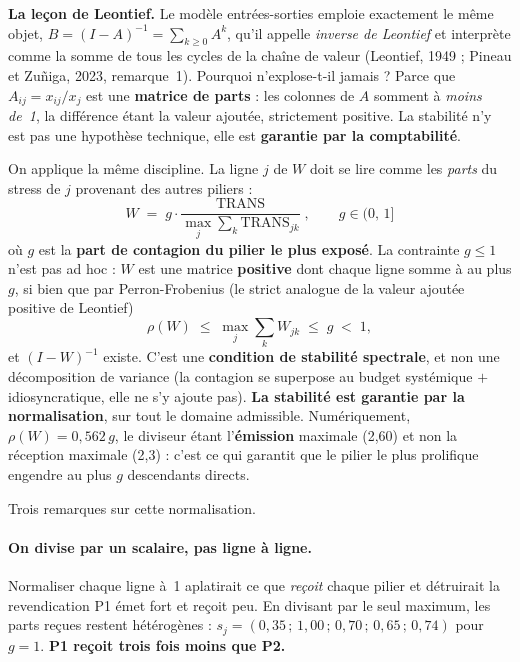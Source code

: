 \documentclass[11pt,a4paper]{article}
\begin{document}
\begin{cle}
\textbf{La leçon de Leontief.} Le modèle entrées-sorties emploie exactement le même objet,
$B = (I-A)^{-1} = \sum_{k\ge 0} A^k$, qu'il appelle \emph{inverse de Leontief} et interprète
comme la somme de tous les cycles de la chaîne de valeur (Leontief, 1949 ; Pineau et
Zu\~niga, 2023, remarque~1). Pourquoi n'explose-t-il jamais ? Parce que
$A_{ij} = x_{ij}/x_j$ est une \textbf{matrice de parts} : les colonnes de $A$ somment à
\emph{moins de~1}, la différence étant la valeur ajoutée, strictement positive. La stabilité
n'y est pas une hypothèse technique, elle est \textbf{garantie par la comptabilité}.

\smallskip
\noindent On applique la même discipline. La ligne $j$ de $W$ doit se lire comme les
\emph{parts} du stress de $j$ provenant des autres piliers :
\begin{equation}
\label{eq:norm}
\boxed{\;W \;=\; g \cdot \frac{\mathrm{TRANS}}{\max_j \sum_k \mathrm{TRANS}_{jk}}\;,
\qquad g \in (0,\,1]\;}
\end{equation}
où $g$ est la \textbf{part de contagion du pilier le plus exposé}. La contrainte $g\le 1$
n'est pas ad hoc : $W$ est une matrice \textbf{positive} dont chaque ligne somme à au plus $g$,
si bien que par Perron-Frobenius (le strict analogue de la valeur ajoutée positive de Leontief)
\[
\rho(W) \;\le\; \max_j \sum_k W_{jk} \;\le\; g \;<\; 1 ,
\]
et $(I-W)^{-1}$ existe. C'est une \textbf{condition de stabilité spectrale}, et non une
décomposition de variance (la contagion se superpose au budget systémique $+$ idiosyncratique,
elle ne s'y ajoute pas). \textbf{La stabilité est garantie par la normalisation}, sur tout le
domaine admissible. Numériquement, $\rho(W) = 0{,}562\,g$, le diviseur étant l'\textbf{émission}
maximale (2,60) et non la réception maximale (2,3) : c'est ce qui garantit que le pilier le plus
prolifique engendre au plus $g$ descendants directs.
\end{cle}

\noindent Trois remarques sur cette normalisation.

\paragraph{On divise par un scalaire, pas ligne à ligne.} Normaliser chaque ligne à~1
aplatirait ce que \emph{reçoit} chaque pilier et détruirait la revendication \og{}P1 émet
fort et reçoit peu\fg{}. En divisant par le seul maximum, les parts reçues restent
hétérogènes : $s_j = (0{,}35\,;\,1{,}00\,;\,0{,}70\,;\,0{,}65\,;\,0{,}74)$ pour $g=1$.
\textbf{P1 reçoit trois fois moins que P2.}
\end{document}
